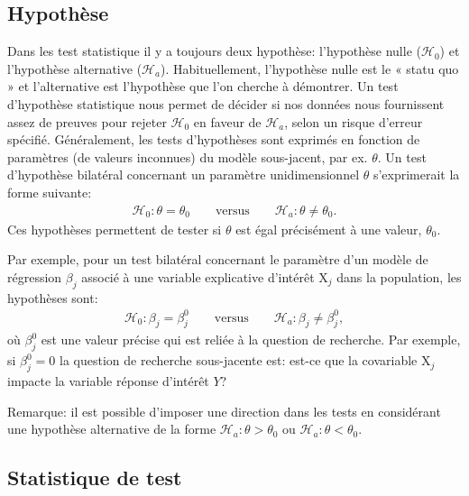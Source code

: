 \documentclass[
  11pt,
  letterpaper,
]{book}
\begin{document}
\hypertarget{hypothuxe8se}{%
\subsection{Hypothèse}\label{hypothuxe8se}}

Dans les test statistique il y a toujours deux hypothèse: l'hypothèse nulle (\(\mathscr{H}{}_{0}\)) et l'hypothèse alternative (\(\mathscr{H}_a\)). Habituellement, l'hypothèse nulle est le « statu quo » et l'alternative est l'hypothèse que l'on cherche à démontrer. Un test d'hypothèse statistique nous permet de décider si nos données nous fournissent assez de preuves pour rejeter \(\mathscr{H}_0\) en faveur de \(\mathscr{H}_a\), selon un risque d'erreur spécifié. Généralement, les tests d'hypothèses sont exprimés en fonction de paramètres (de valeurs inconnues) du modèle sous-jacent, par ex. \(\theta\). Un test d'hypothèse bilatéral concernant un paramètre unidimensionnel \(\theta\) s'exprimerait la forme suivante:
\begin{align*}
\mathscr{H}_0: \theta=\theta_0 \qquad \text{versus} \qquad \mathscr{H}_a:\theta \neq \theta_0.
\end{align*}
Ces hypothèses permettent de tester si \(\theta\) est égal précisément à une valeur, \(\theta_0\).

Par exemple, pour un test bilatéral concernant le paramètre d'un modèle de régression \(\beta_j\) associé à une variable explicative d'intérêt \(\mathrm{X}_j\) dans la population, les hypothèses sont:
\begin{align*}
\mathscr{H}_0: \beta_j=\beta_j^0 \qquad \text{versus} \qquad \mathscr{H}_a:\beta_j \neq \beta_j^0, 
\end{align*}
où \(\beta_j^0\) est une valeur précise qui est reliée à la question de recherche. Par exemple, si \(\beta_j^0=0\) la question de recherche sous-jacente est: est-ce que la covariable \(\mathrm{X}_j\) impacte la variable réponse d'intérêt \(Y\)?

Remarque: il est possible d'imposer une direction dans les tests en considérant une hypothèse alternative de la forme \(\mathscr{H}_a: \theta > \theta_0\) ou \(\mathscr{H}_a: \theta < \theta_0\).

\hypertarget{statistique-de-test}{%
\subsection{Statistique de test}\label{statistique-de-test}}
\end{document}
